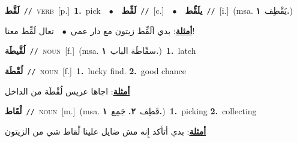 \documentclass[10pt,a4paper,twoside]{article} %
\begin{document}
\begin{multicols}{2}
{\setlength\topsep{0pt}\textbf{\foreignlanguage{arabic}{لَقَّط}}\ {\color{gray}\texttt{//}\color{black}}\ \textsc{verb}\ [p.]\ \textbf{1.}~pick\ \ $\bullet$\ \ \setlength\topsep{0pt}\textbf{\foreignlanguage{arabic}{لَقِّط}}\ {\color{gray}\texttt{//}\color{black}}\ [c.]\ \ $\bullet$\ \ \setlength\topsep{0pt}\textbf{\foreignlanguage{arabic}{يلَقِّط}}\ {\color{gray}\texttt{//}\color{black}}\ [i.]\ \color{gray}(msa. \foreignlanguage{arabic}{يَقْطِف}~\foreignlanguage{arabic}{\textbf{١.}})\color{black}\  \begin{flushright}\color{gray}\foreignlanguage{arabic}{\textbf{\underline{\foreignlanguage{arabic}{أمثلة}}}: بدي ألَقِّط زيتون مع دار عمي\ $\bullet$\ \  تعال لَقِّط معنا!}\end{flushright}\color{black}} \vspace{2mm}

{\setlength\topsep{0pt}\textbf{\foreignlanguage{arabic}{لُقَّيطَة}}\ {\color{gray}\texttt{//}\color{black}}\ \textsc{noun}\ [f.]\ \color{gray}(msa. \foreignlanguage{arabic}{سقّاطَة الباب}~\foreignlanguage{arabic}{\textbf{١.}})\color{black}\ \textbf{1.}~latch\ } \vspace{2mm}

{\setlength\topsep{0pt}\textbf{\foreignlanguage{arabic}{لُقْطَة}}\ {\color{gray}\texttt{//}\color{black}}\ \textsc{noun}\ [f.]\ \textbf{1.}~lucky find.  \textbf{2.}~good chance\  \begin{flushright}\color{gray}\foreignlanguage{arabic}{\textbf{\underline{\foreignlanguage{arabic}{أمثلة}}}: اجاها عريس لُقْطَة من الداخل}\end{flushright}\color{black}} \vspace{2mm}

{\setlength\topsep{0pt}\textbf{\foreignlanguage{arabic}{لْقَاط}}\ {\color{gray}\texttt{//}\color{black}}\ \textsc{noun}\ [m.]\ \color{gray}(msa. \foreignlanguage{arabic}{قَطِف}~\foreignlanguage{arabic}{\textbf{٢.}}  \foreignlanguage{arabic}{جَمِع}~\foreignlanguage{arabic}{\textbf{١.}})\color{black}\ \textbf{1.}~picking  \textbf{2.}~collecting\  \begin{flushright}\color{gray}\foreignlanguage{arabic}{\textbf{\underline{\foreignlanguage{arabic}{أمثلة}}}: بدي أتأكد إِنه مش ضايل علينا لْقاط شي من الزيتون}\end{flushright}\color{black}} \vspace{2mm}


\end{multicols}
\end{document}
